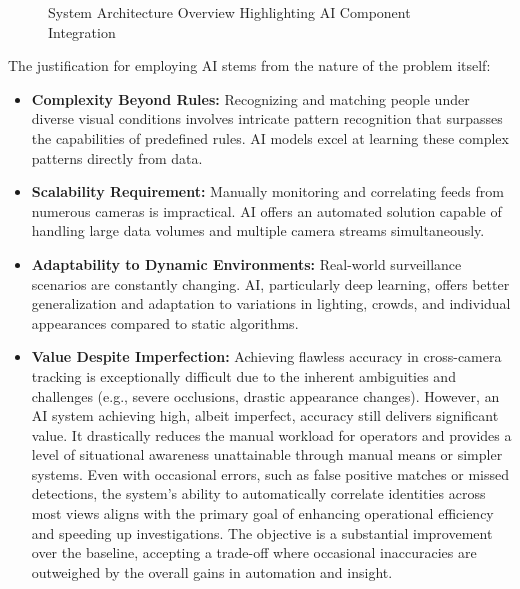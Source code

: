 \begin{figure}[!htb] %
    \centering
    \makebox[\textwidth][c]{
        \rule{1.0\textwidth}{0.6\textwidth}
    }
    \caption{System Architecture Overview Highlighting AI Component Integration}
    \label{fig:system_architecture} %
\end{figure}
\clearpage %
The justification for employing AI stems from the nature of the problem itself:
\begin{itemize}
    \item \textbf{Complexity Beyond Rules:} Recognizing and matching people under diverse visual conditions involves intricate pattern recognition that surpasses the capabilities of predefined rules. AI models excel at learning these complex patterns directly from data.
    \item \textbf{Scalability Requirement:} Manually monitoring and correlating feeds from numerous cameras is impractical. AI offers an automated solution capable of handling large data volumes and multiple camera streams simultaneously.
    \item \textbf{Adaptability to Dynamic Environments:} Real-world surveillance scenarios are constantly changing. AI, particularly deep learning, offers better generalization and adaptation to variations in lighting, crowds, and individual appearances compared to static algorithms.
    \item \textbf{Value Despite Imperfection:} Achieving flawless accuracy in cross-camera tracking is exceptionally difficult due to the inherent ambiguities and challenges (e.g., severe occlusions, drastic appearance changes). However, an AI system achieving high, albeit imperfect, accuracy still delivers significant value. It drastically reduces the manual workload for operators and provides a level of situational awareness unattainable through manual means or simpler systems. Even with occasional errors, such as false positive matches or missed detections, the system's ability to automatically correlate identities across most views aligns with the primary goal of enhancing operational efficiency and speeding up investigations. The objective is a substantial improvement over the baseline, accepting a trade-off where occasional inaccuracies are outweighed by the overall gains in automation and insight.
\end{itemize}

